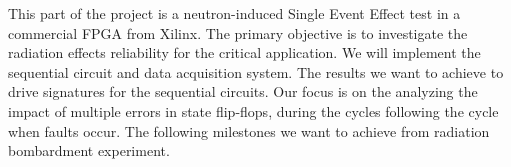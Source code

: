 %
%
%
%





This part of the project is a neutron-induced Single Event Effect test in a commercial FPGA from Xilinx. The primary objective is to investigate the radiation effects reliability for the critical application. We will implement the sequential circuit and data acquisition system. The results we want to achieve to drive signatures for the sequential circuits. Our focus is on the analyzing the impact of multiple errors in state flip-flops, during the cycles following the cycle when faults occur. The following milestones we want to achieve from radiation bombardment experiment.


